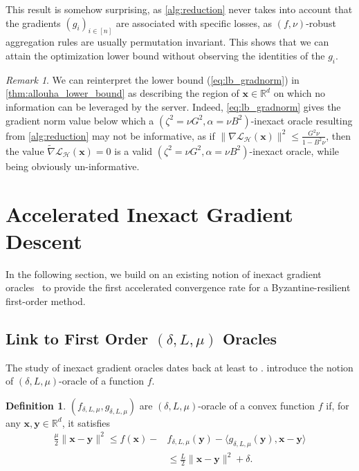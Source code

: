 \documentclass{article}
\def\vx{{\bm{x}}}
\def\vy{{\bm{y}}}
\newcommand{\R}{\mathbb{R}}
\newcommand{\cH}{\mathcal{H}}
\newcommand{\cL}{\mathcal{L}}
\theoremstyle{plain}
\theoremstyle{definition}
\newtheorem{definition}[theorem]{Definition}
\theoremstyle{remark}
\newtheorem{remark}[theorem]{Remark}
\begin{document}
This result is somehow surprising, as \cref{alg:reduction} never takes into account that the gradients $(g_i)_{i\in[n]}$ are associated with specific losses, as $(f,\nu)$-robust aggregation rules are usually permutation invariant. This shows that we can attain the optimization lower bound  without observing the identities of the $g_i$.







\begin{remark}
    We can reinterpret the lower bound (\ref{eq:lb_gradnorm}) in \cref{thm:allouha_lower_bound} as describing the region of $\vx \in \R^d$ on which no information can be leveraged by the server. Indeed, 
\cref{eq:lb_gradnorm} gives the gradient  norm value below which 
a $(\zeta^2=\nu G^2, \alpha = \nu B^2)$-inexact oracle resulting from \cref{alg:reduction} may not be informative,
as if $\|\nabla\cL_{\cH}(\vx)\|^2 \le \frac{G^2 \nu}{1 - B^2 \nu}$, then the value $\tilde{\nabla}\cL_{\cH}(\vx) =0$  is a valid $(\zeta^2=\nu G^2, \alpha = \nu B^2)$-inexact oracle, while being obviously un-informative.
\end{remark}







\section{Accelerated Inexact Gradient Descent}
\label{sec:accelerated}

In the following section, we build on an existing notion of inexact gradient oracles~\citep{devolder2013first, devolder2014first} to provide the first accelerated convergence rate for a Byzantine-resilient first-order method.

\subsection{Link to First Order $(\delta,L,\mu)$ Oracles}

The study of inexact gradient oracles dates back at least to \citet{d2008smooth}. \citet{devolder2013first}  introduce the notion of $(\delta, L,\mu)$-oracle of a function $f$. 
\begin{definition}
    $(f_{\delta,L,\mu}, g_{\delta,L,\mu})$ are $(\delta, L,\mu)$-oracle of a convex function $f$ if, for any $\vx,\vy \in \R^d$, it satisfies 
    \begin{align*}
        \frac{\mu}{2}\|\vx-\vy\|^2 \le f(\vx) - &f_{\delta, L,\mu}(\vy) - \langle g_{\delta, L,\mu}(\vy), \vx-\vy \rangle \\ &\le \frac{L}{2}\|\vx-\vy\|^2 + \delta.
    \end{align*}
\end{definition}
\end{document}
